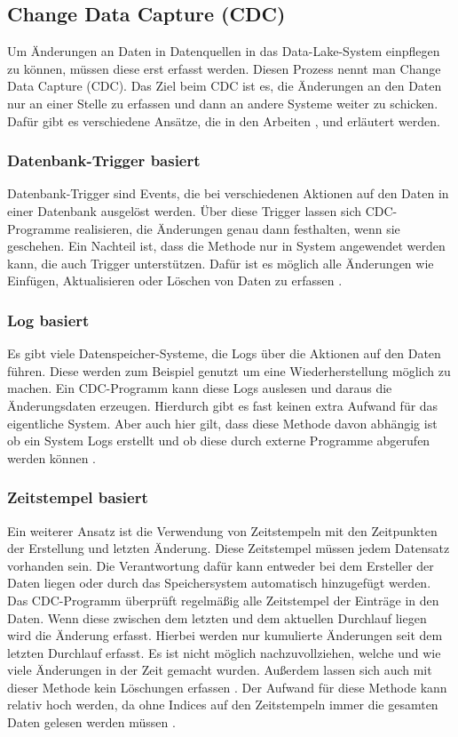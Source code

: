 \subsection{Change Data Capture (CDC)}
\label{sec:cdc}

Um Änderungen an Daten in Datenquellen in das Data-Lake-System einpflegen zu können, müssen diese erst erfasst werden.
Diesen Prozess nennt man Change Data Capture (CDC).
Das Ziel beim CDC ist es, die Änderungen an den Daten nur an einer Stelle zu erfassen und dann an andere Systeme weiter zu schicken.
Dafür gibt es verschiedene Ansätze, die in den Arbeiten \parencite{delta-view_gen}, \parencite{cdc_in_nosql} und \parencite{boeing} erläutert werden.

\subsubsection{Datenbank-Trigger basiert}
Datenbank-Trigger sind Events, die bei verschiedenen Aktionen auf den Daten in einer Datenbank ausgelöst werden.
Über diese Trigger lassen sich CDC-Programme realisieren, die Änderungen genau dann festhalten, wenn sie geschehen.
Ein Nachteil ist, dass die Methode nur in System angewendet werden kann, die auch Trigger unterstützen.
Dafür ist es möglich alle Änderungen wie Einfügen, Aktualisieren oder Löschen von Daten zu erfassen \parencite{boeing}.

\subsubsection{Log basiert}
Es gibt viele Datenspeicher-Systeme, die Logs über die Aktionen auf den Daten führen.
Diese werden zum Beispiel genutzt um eine Wiederherstellung möglich zu machen.
Ein CDC-Programm kann diese Logs auslesen und daraus die Änderungsdaten erzeugen.
Hierdurch gibt es fast keinen extra Aufwand für das eigentliche System.
Aber auch hier gilt, dass diese Methode davon abhängig ist ob ein System Logs erstellt und ob diese durch externe Programme abgerufen werden können \parencite{delta-view_gen}.


\subsubsection{Zeitstempel basiert}
Ein weiterer Ansatz ist die Verwendung von Zeitstempeln mit den Zeitpunkten der Erstellung und letzten Änderung.
Diese Zeitstempel müssen jedem Datensatz vorhanden sein.
Die Verantwortung dafür kann entweder bei dem Ersteller der Daten liegen oder durch das Speichersystem automatisch hinzugefügt werden.
Das CDC-Programm überprüft regelmäßig alle Zeitstempel der Einträge in den Daten.
Wenn diese zwischen dem letzten und dem aktuellen Durchlauf liegen wird die Änderung erfasst.
Hierbei werden nur kumulierte Änderungen seit dem letzten Durchlauf erfasst.
Es ist nicht möglich nachzuvollziehen, welche und wie viele Änderungen in der Zeit gemacht wurden.
Außerdem lassen sich auch mit dieser Methode kein Löschungen erfassen \parencite{delta-view_gen}.
Der Aufwand für diese Methode kann relativ hoch werden, da ohne Indices auf den Zeitstempeln immer die gesamten Daten gelesen werden müssen \cite{boeing}.

